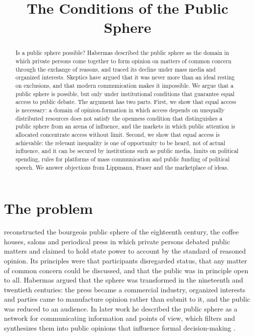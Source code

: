 \documentclass{situationist-preprint}
\title{The Conditions of the Public Sphere}
\begin{document}
\maketitle

\begin{abstract}
Is a public sphere possible? Habermas described the public sphere as the domain in which private persons come together to form opinion on matters of common concern through the exchange of reasons, and traced its decline under mass media and organized interests. Skeptics have argued that it was never more than an ideal resting on exclusions, and that modern communication makes it impossible. We argue that a public sphere is possible, but only under institutional conditions that guarantee equal access to public debate. The argument has two parts. First, we show that equal access is necessary: a domain of opinion-formation in which access depends on unequally distributed resources does not satisfy the openness condition that distinguishes a public sphere from an arena of influence, and the markets in which public attention is allocated concentrate access without limit. Second, we show that equal access is achievable: the relevant inequality is one of opportunity to be heard, not of actual influence, and it can be secured by institutions such as public media, limits on political spending, rules for platforms of mass communication and public funding of political speech. We answer objections from Lippmann, Fraser and the marketplace of ideas.
\end{abstract}

\section{The problem}

\citet{Habermas1989} reconstructed the bourgeois public sphere of the eighteenth century, the coffee houses, salons and periodical press in which private persons debated public matters and claimed to hold state power to account by the standard of reasoned opinion. Its principles were that participants disregarded status, that any matter of common concern could be discussed, and that the public was in principle open to all. Habermas argued that the sphere was transformed in the nineteenth and twentieth centuries: the press became a commercial industry, organized interests and parties came to manufacture opinion rather than submit to it, and the public was reduced to an audience. In later work he described the public sphere as a network for communicating information and points of view, which filters and synthesizes them into public opinions that influence formal decision-making \citep{Habermas1996}.
\end{document}
